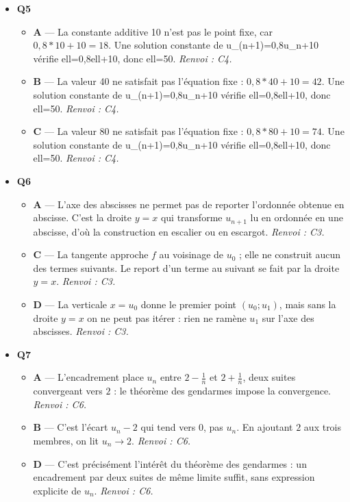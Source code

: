 \begin{itemize}
\begin{itemize}
    \item \textbf{B} — Population constante. Le modèle de Malthus s'écrit y'=ay : le coefficient de croissance a est constant et la variation est proportionnelle à la population. \emph{Renvoi : C5.}
    \item \textbf{D} — Modèle avec capacité d'accueil. Le modèle de Malthus s'écrit y'=ay : le coefficient de croissance a est constant et la variation est proportionnelle à la population. \emph{Renvoi : C5.}
  \end{itemize}
  \item \textbf{Q5}
  \begin{itemize}
    \item \textbf{A} — La constante additive 10 n'est pas le point fixe, car $0{,}8*10+10=18$. Une solution constante de u\_(n+1)=0,8u\_n+10 vérifie ell=0,8ell+10, donc ell=50. \emph{Renvoi : C4.}
    \item \textbf{B} — La valeur 40 ne satisfait pas l'équation fixe : $0{,}8*40+10=42$. Une solution constante de u\_(n+1)=0,8u\_n+10 vérifie ell=0,8ell+10, donc ell=50. \emph{Renvoi : C4.}
    \item \textbf{C} — La valeur 80 ne satisfait pas l'équation fixe : $0{,}8*80+10=74$. Une solution constante de u\_(n+1)=0,8u\_n+10 vérifie ell=0,8ell+10, donc ell=50. \emph{Renvoi : C4.}
  \end{itemize}
  \item \textbf{Q6}
  \begin{itemize}
    \item \textbf{A} — L'axe des abscisses ne permet pas de reporter l'ordonnée obtenue en abscisse. C'est la droite $y=x$ qui transforme $u_{n+1}$ lu en ordonnée en une abscisse, d'où la construction en escalier ou en escargot. \emph{Renvoi : C3.}
    \item \textbf{C} — La tangente approche $f$ au voisinage de $u_0$ ; elle ne construit aucun des termes suivants. Le report d'un terme au suivant se fait par la droite $y=x$. \emph{Renvoi : C3.}
    \item \textbf{D} — La verticale $x=u_0$ donne le premier point $(u_0;u_1)$, mais sans la droite $y=x$ on ne peut pas itérer : rien ne ramène $u_1$ sur l'axe des abscisses. \emph{Renvoi : C3.}
  \end{itemize}
  \item \textbf{Q7}
  \begin{itemize}
    \item \textbf{A} — L'encadrement place $u_n$ entre $2-\tfrac1n$ et $2+\tfrac1n$, deux suites convergeant vers $2$ : le théorème des gendarmes impose la convergence. \emph{Renvoi : C6.}
    \item \textbf{B} — C'est l'écart $u_n-2$ qui tend vers $0$, pas $u_n$. En ajoutant $2$ aux trois membres, on lit $u_n\to2$. \emph{Renvoi : C6.}
    \item \textbf{D} — C'est précisément l'intérêt du théorème des gendarmes : un encadrement par deux suites de même limite suffit, sans expression explicite de $u_n$. \emph{Renvoi : C6.}
  \end{itemize}
\end{itemize}
\fi
